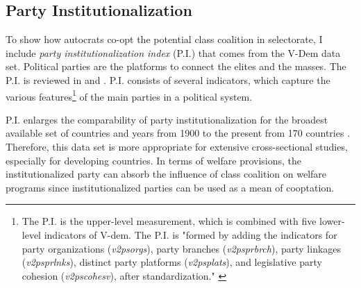\documentclass[11pt]{article}
\begin{document}
\subsection{Party Institutionalization}

To show how autocrats co-opt the potential class coalition in selectorate, I include \textit{party institutionalization index} (P.I.) that comes from the V-Dem data set. Political parties are the platforms to connect the elites and the masses. The P.I. is reviewed in \citet{Bizzarro2018} and \citet{Rasmussen2019}. P.I. consists of several indicators, which capture the various features\footnote{The P.I. is the upper-level measurement, which is combined with five lower-level indicators of V-dem. The P.I. is "formed by adding the indicators for party organizations (\textit{v2psorgs}), party branches (\textit{v2psprbrch}), party linkages (\textit{v2psprlnks}), distinct party platforms (\textit{v2psplats}), and legislative party cohesion (\textit{v2pscohesv}), after standardization." \citep[2]{Bizzarro2017}} of the main parties in a political system.\par

P.I. enlarges the comparability of party institutionalization for the broadest available set of countries and years from 1900 to the present from 170 countries \citep[9]{Rasmussen2019}. Therefore, this data set is more appropriate for extensive cross-sectional studies, especially for developing countries. In terms of welfare provisions, the institutionalized party can absorb the influence of class coalition on welfare programs since institutionalized parties can be used as a mean of cooptation.\par

\end{document}

